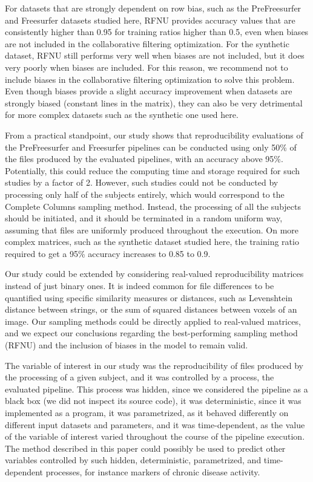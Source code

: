 \documentclass[10pt, conference, compsocconf]{IEEEtran}
\begin{document}
For datasets that are strongly dependent on row bias, such as the 
PreFreesurfer and Freesurfer datasets studied here, RFNU provides 
accuracy values that are consistently higher than 0.95 for training 
ratios higher than 0.5, even 
when biases are not included in the collaborative filtering 
optimization. For the synthetic dataset, RFNU still performs very well 
when biases are not included, but it does very poorly when biases are included.
For this reason, we recommend not to include biases in the collaborative filtering 
optimization to solve this problem. Even though biases provide a slight 
accuracy improvement when datasets are strongly biased (constant lines 
in the matrix), they can also be very detrimental for more complex 
datasets such as the synthetic one used here.

From a practical standpoint, our study shows that reproducibility 
evaluations of the PreFreesurfer and Freesurfer pipelines can be 
conducted using only 50\% of the files produced by the evaluated 
pipelines, with an accuracy above 95\%. Potentially, this could reduce 
the computing time and storage required for such studies by a factor of 
2. However, such studies could not be conducted by processing only half 
of the subjects entirely, which would correspond to the Complete 
Columns sampling method. Instead, the processing of all the subjects 
should be initiated, and it should be terminated in a random uniform 
way, assuming that files are uniformly produced throughout the 
execution. On more complex matrices, such as the synthetic dataset 
studied here, the training ratio required to get a 95\% accuracy 
increases to 0.85 to 0.9.



Our study could be extended by considering real-valued reproducibility 
matrices instead of just binary ones. It is indeed common for file 
differences to be quantified using specific similarity measures or 
distances, such as Levenshtein distance between strings, or the sum of 
squared distances between voxels of an image. Our sampling methods 
could be directly applied to real-valued matrices, and we expect our 
conclusions regarding the best-performing sampling method (RFNU) and 
the inclusion of biases in the model to remain valid.

The variable of interest in our study was the reproducibility of files 
produced by the processing of a given subject, and it was controlled by 
a process, the evaluated pipeline. This process was hidden, since we 
considered the pipeline as a black box (we did not inspect its source 
code), it was deterministic, since it was implemented as a program, it 
was parametrized, as it behaved differently on different input datasets 
and parameters, and it was time-dependent, as the value of the 
variable of interest varied throughout the course of the pipeline 
execution. The method described in this paper could possibly be used to 
predict other variables controlled by such hidden, deterministic, 
parametrized, and time-dependent processes, for instance markers of 
chronic disease activity.
\end{document}
